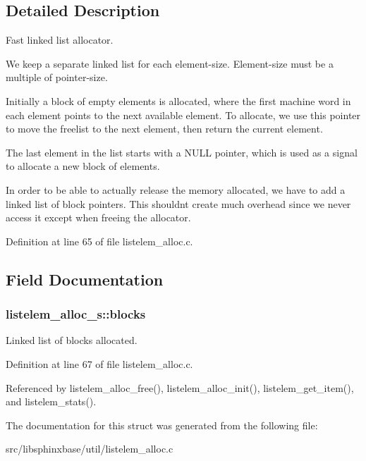 \subsection{Detailed Description}
Fast linked list allocator. 

We keep a separate linked list for each element-\/size. Element-\/size must be a multiple of pointer-\/size.

Initially a block of empty elements is allocated, where the first machine word in each element points to the next available element. To allocate, we use this pointer to move the freelist to the next element, then return the current element.

The last element in the list starts with a N\+U\+L\+L pointer, which is used as a signal to allocate a new block of elements.

In order to be able to actually release the memory allocated, we have to add a linked list of block pointers. This shouldn\textquotesingle{}t create much overhead since we never access it except when freeing the allocator. 

Definition at line 65 of file listelem\+\_\+alloc.\+c.



\subsection{Field Documentation}
\subsubsection[{blocks}]{ listelem\+\_\+alloc\+\_\+s\+::blocks}\label{structlistelem__alloc__s_a1216578b1d5416dc0a03c802cfa1def9}


Linked list of blocks allocated. 



Definition at line 67 of file listelem\+\_\+alloc.\+c.



Referenced by listelem\+\_\+alloc\+\_\+free(), listelem\+\_\+alloc\+\_\+init(), listelem\+\_\+get\+\_\+item(), and listelem\+\_\+stats().



The documentation for this struct was generated from the following file\+:\begin{DoxyCompactItemize}
\item 
src/libsphinxbase/util/listelem\+\_\+alloc.\+c\end{DoxyCompactItemize}
